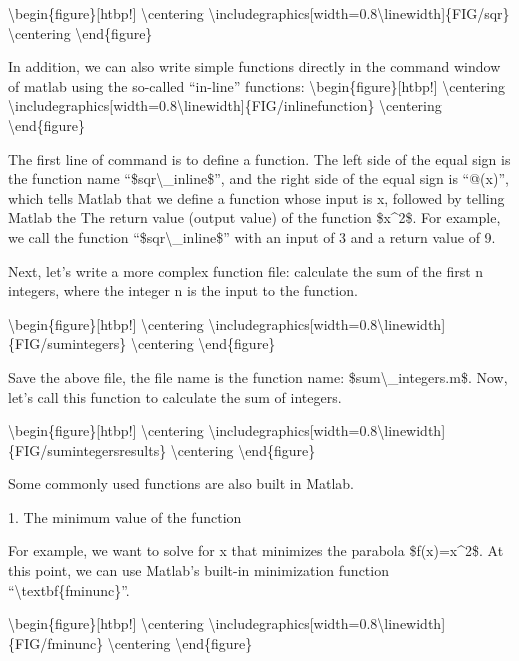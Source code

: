 \documentclass[10pt,math=newtx,citestyle=gb7714-2015,bibstyle=gb7714-2015]{elegantbook}
\begin{document}
	\textbackslash{}begin\{figure\}[htbp!]
	\textbackslash{}centering
	\textbackslash{}includegraphics[width=0.8\textbackslash{}linewidth]\{FIG/sqr\}
	\textbackslash{}centering
	\textbackslash{}end\{figure\}
	
	In addition, we can also write simple functions directly in the command window of matlab using the so-called ``in-line'' functions:
	\textbackslash{}begin\{figure\}[htbp!]
	\textbackslash{}centering
	\textbackslash{}includegraphics[width=0.8\textbackslash{}linewidth]\{FIG/inlinefunction\}
	\textbackslash{}centering
	\textbackslash{}end\{figure\}
	
	The first line of command is to define a function. The left side of the equal sign is the function name ``\$sqr\textbackslash{}\_inline\$'', and the right side of the equal sign is ``@(x)'', which tells Matlab that we define a function whose input is x, followed by telling Matlab the The return value (output value) of the function \$x\^{}2\$. For example, we call the function ``\$sqr\textbackslash{}\_inline\$'' with an input of 3 and a return value of 9.
	
	Next, let's write a more complex function file: calculate the sum of the first n integers, where the integer n is the input to the function.
	
	\textbackslash{}begin\{figure\}[htbp!]
	\textbackslash{}centering
	\textbackslash{}includegraphics[width=0.8\textbackslash{}linewidth]\{FIG/sumintegers\}
	\textbackslash{}centering
	\textbackslash{}end\{figure\}
	
	Save the above file, the file name is the function name: \$sum\textbackslash{}\_integers.m\$. Now, let's call this function to calculate the sum of integers.
	
	\textbackslash{}begin\{figure\}[htbp!]
	\textbackslash{}centering
	\textbackslash{}includegraphics[width=0.8\textbackslash{}linewidth]\{FIG/sumintegersresults\}
	\textbackslash{}centering
	\textbackslash{}end\{figure\}
	
	Some commonly used functions are also built in Matlab.
	
	1. The minimum value of the function
	
	For example, we want to solve for x that minimizes the parabola \$f(x)=x\^{}2\$. At this point, we can use Matlab's built-in minimization function ``\textbackslash{}textbf\{fminunc\}''.
	
	\textbackslash{}begin\{figure\}[htbp!]
	\textbackslash{}centering
	\textbackslash{}includegraphics[width=0.8\textbackslash{}linewidth]\{FIG/fminunc\}
	\textbackslash{}centering
	\textbackslash{}end\{figure\}
	
\end{document}
